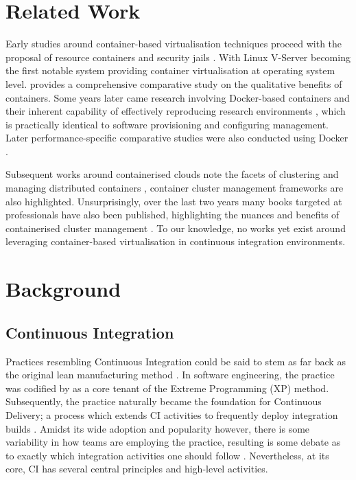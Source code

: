 \documentclass{report}
\begin{document}
\section{Related Work}
Early studies around container-based virtualisation techniques
proceed with the proposal of resource containers \citep{Banga} and security
jails \citep{Kamp}.  With Linux V-Server becoming the first notable system providing
container virtualisation at operating system level.
\citet{Soltesz} provides a comprehensive comparative 
study on the qualitative benefits of containers. Some years later
came research involving Docker-based containers and their inherent capability of effectively
reproducing research environments \citep{Boettiger}, which is practically
identical to software provisioning 
and configuring management. Later performance-specific comparative studies were also conducted 
using Docker \citep{Agarwal}.
\par
Subsequent works around containerised clouds note 
the facets of clustering and managing distributed containers \citep{Claus, Verma}, container 
cluster management frameworks are also highlighted. 
Unsurprisingly, over the last two years many books targeted at professionals
have also been  
published, highlighting the nuances and benefits of containerised cluster management
\citep{db, holla, Rensin, Brewer}. To our knowledge, no works yet exist around
leveraging container-based virtualisation in continuous integration environments.  

\section{Background}
\subsection{Continuous Integration}
Practices resembling Continuous Integration could be said
to stem as far back as the original lean manufacturing method \citep{Fitz}. 
In software engineering, the practice was codified by \citet{Beck} 
as a core tenant of the Extreme Programming (XP) method.
Subsequently, the practice naturally became the foundation for Continuous
Delivery; a process which extends CI activities to frequently deploy integration builds \citep{Jez}.
Amidst its wide adoption and popularity however, 
there is some variability in how teams are employing the practice, resulting 
is some debate as to exactly which integration activities one should follow \citep{Stahl}.
Nevertheless, at its core, CI has several central principles and high-level activities.
\end{document}
